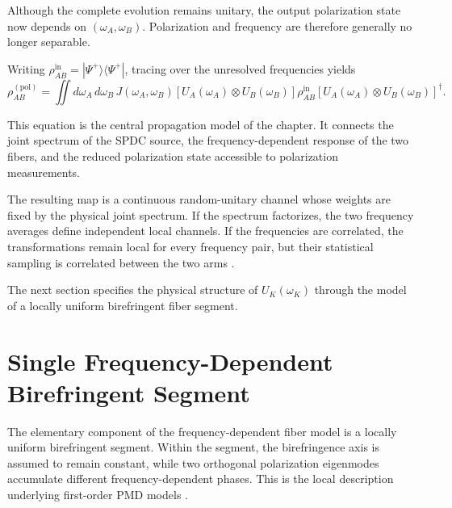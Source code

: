 Although the complete evolution remains unitary, the output polarization
state now depends on \((\omega_A,\omega_B)\). Polarization and frequency are
therefore generally no longer separable.

Writing
\(\rho_{AB}^{\mathrm{in}}
=|\Psi^+\rangle\langle\Psi^+|\),
tracing over the unresolved frequencies yields
%
\begin{equation}
    \rho_{AB}^{(\mathrm{pol})}
    =
    \iint
    d\omega_A\,d\omega_B\,
    J(\omega_A,\omega_B)
    \left[
        U_A(\omega_A)
        \otimes
        U_B(\omega_B)
    \right]
    \rho_{AB}^{\mathrm{in}}
    \left[
        U_A(\omega_A)
        \otimes
        U_B(\omega_B)
    \right]^\dagger.
    \label{eq:frequency_averaged_polarization_state}
\end{equation}

This equation is the central propagation model of the chapter. It connects
the joint spectrum of the SPDC source, the frequency-dependent response of
the two fibers, and the reduced polarization state accessible to
polarization measurements.

The resulting map is a continuous random-unitary channel whose weights are
fixed by the physical joint spectrum. If the spectrum factorizes, the two
frequency averages define independent local channels. If the frequencies
are correlated, the transformations remain local for every frequency pair,
but their statistical sampling is correlated between the two arms
\cite{poon_law_stochastic_pmd_2008}.

The next section specifies the physical structure of \(U_K(\omega_K)\)
through the model of a locally uniform birefringent fiber segment.


\section{Single Frequency-Dependent Birefringent Segment}
\label{sec:single_frequency_dependent_segment}

The elementary component of the frequency-dependent fiber model is a locally
uniform birefringent segment. Within the segment, the birefringence axis is
assumed to remain constant, while two orthogonal polarization eigenmodes
accumulate different frequency-dependent phases. This is the local
description underlying first-order PMD models
\cite{foschini_poole_statistical_pmd_1991,
gordon_kogelnik_pmd_2000}.

